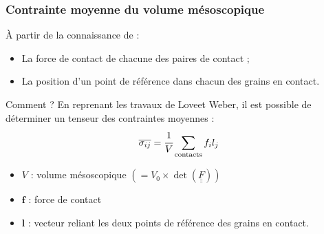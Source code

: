 \documentclass[8pt]{beamer}
\def\doubleunderline#1{\underline{\underline{#1}}}
\begin{document}
\begin{frame}
	\frametitle{Contrainte moyenne du volume mésoscopique}
	\begin{block}{\`A partir de la connaissance de :}
		\begin{itemize}[label=$\rightarrow$]
			\item La force de contact de chacune des paires de contact ;
			\item La position d'un point de référence dans chacun des grains en contact.
		\end{itemize}
	\end{block}
	\begin{block}{Comment ?}
		En reprenant les travaux de Love\footnotemark[1] et Weber\footnotemark[2], il est possible de déterminer un tenseur des contraintes moyennes :
		$$
		\overline{\sigma_{ij}}
		= \cfrac{1}{V} \sum_\text{contacts} f_i l_j
		$$
		\begin{itemize}[label=$\rightarrow$]
			\item $V$ : volume mésoscopique $(=V_0 \times \det(\doubleunderline{F}))$
			\item $\bm{f}$ : force de contact
			\item $\bm{l}$ : vecteur reliant les deux points de référence des grains en contact.
		\end{itemize}
	\end{block}
\end{frame}
\end{document}
